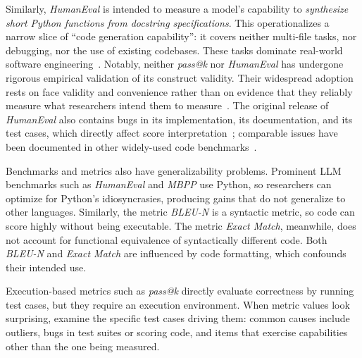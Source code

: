 Similarly, \emph{HumanEval} is intended to measure a model's capability to \textit{synthesize short Python functions from docstring specifications}. This operationalizes a narrow slice of ``code generation capability'': it covers neither multi-file tasks, nor debugging, nor the use of existing codebases. These tasks dominate real-world software engineering~\cite{Chandra2025benchmarks}. Notably, neither \emph{pass@k} nor \emph{HumanEval} has undergone rigorous empirical validation of its construct validity. Their widespread adoption rests on face validity and convenience rather than on evidence that they reliably measure what researchers intend them to measure~\cite{cao2025should}. The original release of \emph{HumanEval} also contains bugs in its implementation, its documentation, and its test cases, which directly affect score interpretation~\cite{DBLP:conf/nips/LiuXW023}; comparable issues have been documented in other widely-used code benchmarks~\cite{cao2025should}.

Benchmarks and metrics also have generalizability problems. Prominent LLM benchmarks such as \emph{HumanEval} and \emph{MBPP} use Python, so researchers can optimize for Python's idiosyncrasies, producing gains that do not generalize to other languages. Similarly, the metric \emph{BLEU-N} is a syntactic metric, so code can score highly without being executable. The metric \emph{Exact Match}, meanwhile, does not account for functional equivalence of syntactically different code. Both \emph{BLEU-N} and \emph{Exact Match} are influenced by code formatting, which confounds their intended use.

Execution-based metrics such as \emph{pass@k} directly evaluate correctness by running test cases, but they require an execution environment.
When metric values look surprising, examine the specific test cases driving them: common causes include outliers, bugs in test suites or scoring code, and items that exercise capabilities other than the one being measured.

